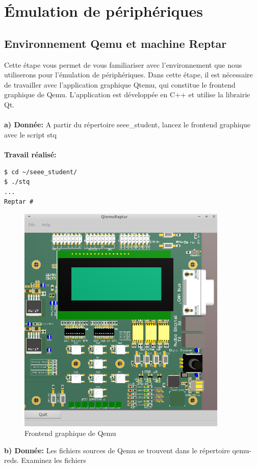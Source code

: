 \newpage
\section{Émulation de périphériques}
\subsection{Environnement Qemu et machine Reptar}
Cette étape vous permet de vous familiariser avec l’environnement que nous utiliserons pour
l’émulation de périphériques.
Dans cette étape, il est nécessaire de travailler avec l'application graphique Qtemu, qui constitue le
frontend graphique de Qemu. L'application est développée en C++ et utilise la librairie Qt. \\\\
\textbf{a) Donnée: }A partir du répertoire seee\_student, lancez le frontend graphique avec le script stq \\\\
\textbf{Travail réalisé: }
\begin{lstlisting}
$ cd ~/seee_student/
$ ./stq
...
Reptar # 
\end{lstlisting}
\begin{figure}[H]
	\begin{center}
		\includegraphics[width=10cm]{img/emulation1.png}
		\caption{Frontend graphique de Qemu}
		\label{emulation1}
	\end{center}
\end{figure}
\textbf{b) Donnée: }Les fichiers sources de Qemu se trouvent dans le répertoire qemu-reds. Examinez les fichiers

